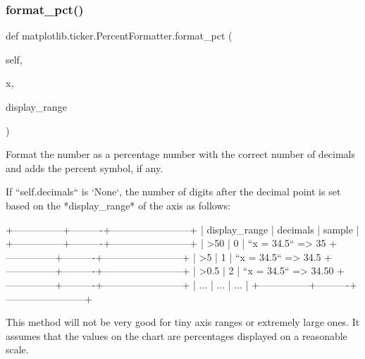 \mbox{\label{classmatplotlib_1_1ticker_1_1PercentFormatter_a370694639d8af031f543d1927a764460}} 
\subsubsection{\texorpdfstring{format\+\_\+pct()}{format\_pct()}}
{\footnotesize\ttfamily def matplotlib.\+ticker.\+Percent\+Formatter.\+format\+\_\+pct (\begin{DoxyParamCaption}\item[{}]{self,  }\item[{}]{x,  }\item[{}]{display\+\_\+range }\end{DoxyParamCaption})}

\begin{DoxyVerb}Format the number as a percentage number with the correct
number of decimals and adds the percent symbol, if any.

If ``self.decimals`` is `None`, the number of digits after the
decimal point is set based on the *display_range* of the axis
as follows:

+---------------+----------+------------------------+
| display_range | decimals |          sample        |
+---------------+----------+------------------------+
| >50           |     0    | ``x = 34.5`` => 35%
+---------------+----------+------------------------+
| >5            |     1    | ``x = 34.5`` => 34.5%
+---------------+----------+------------------------+
| >0.5          |     2    | ``x = 34.5`` => 34.50%
+---------------+----------+------------------------+
|      ...      |    ...   |          ...           |
+---------------+----------+------------------------+

This method will not be very good for tiny axis ranges or
extremely large ones. It assumes that the values on the chart
are percentages displayed on a reasonable scale.
\end{DoxyVerb}
 \mbox{\label{classmatplotlib_1_1ticker_1_1PercentFormatter_aaef19a9c79b4051f06e4709c71378ee0}} 
